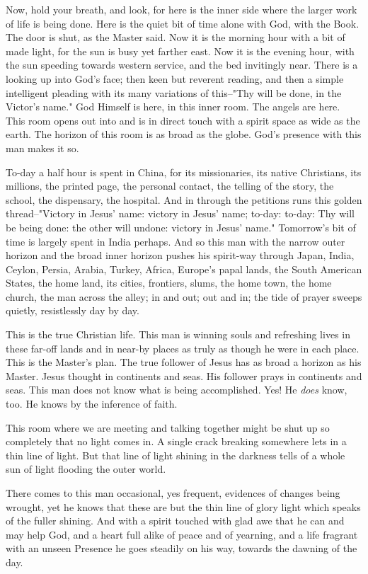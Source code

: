 Now, hold your breath, and look, for here is the inner side where the
larger work of life is being done. Here is the quiet bit of time alone
with God, with the Book. The door is shut, as the Master said. Now it is
the morning hour with a bit of made light, for the sun is busy yet farther
east. Now it is the evening hour, with the sun speeding towards western
service, and the bed invitingly near. There is a looking up into God's
face; then keen but reverent reading, and then a simple intelligent
pleading with its many variations of this--"Thy will be done, in the
Victor's name." God Himself is here, in this inner room. The angels are
here. This room opens out into and is in direct touch with a spirit space
as wide as the earth. The horizon of this room is as broad as the globe.
God's presence with this man makes it so.

To-day a half hour is spent in China, for its missionaries, its native
Christians, its millions, the printed page, the personal contact, the
telling of the story, the school, the dispensary, the hospital. And in
through the petitions runs this golden thread--"Victory in Jesus' name:
victory in Jesus' name; to-day: to-day: Thy will be being done: the other
will undone: victory in Jesus' name." Tomorrow's bit of time is largely
spent in India perhaps. And so this man with the narrow outer horizon and
the broad inner horizon pushes his spirit-way through Japan, India,
Ceylon, Persia, Arabia, Turkey, Africa, Europe's papal lands, the South
American States, the home land, its cities, frontiers, slums, the home
town, the home church, the man across the alley; in and out; out and in;
the tide of prayer sweeps quietly, resistlessly day by day.

This is the true Christian life. This man is winning souls and refreshing
lives in these far-off lands and in near-by places as truly as though he
were in each place. This is the Master's plan. The true follower of Jesus
has as broad a horizon as his Master. Jesus thought in continents and
seas. His follower prays in continents and seas. This man does not know
what is being accomplished. Yes! He \textit{does} know, too. He knows by the
inference of faith.

This room where we are meeting and talking together might be shut up so
completely that no light comes in. A single crack breaking somewhere lets
in a thin line of light. But that line of light shining in the darkness
tells of a whole sun of light flooding the outer world.

There comes to this man occasional, yes frequent, evidences of changes
being wrought, yet he knows that these are but the thin line of glory
light which speaks of the fuller shining. And with a spirit touched with
glad awe that he can and may help God, and a heart full alike of peace and
of yearning, and a life fragrant with an unseen Presence he goes steadily
on his way, towards the dawning of the day.




